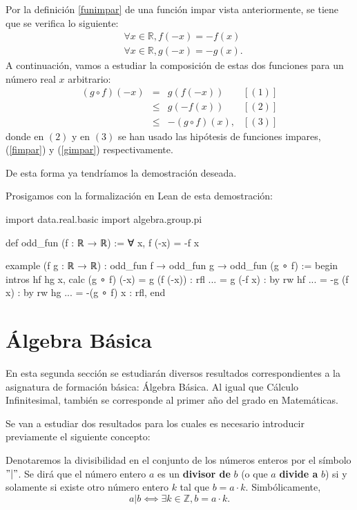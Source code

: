 \begin{demostracion}
  Por la definición \ref{funimpar} de una función impar vista
  anteriormente, se tiene que se verifica lo siguiente:
  \begin{align}
    & ∀ x ∈ ℝ, f(-x) = -f(x)  \label{fimpar} \\
    & ∀ x ∈ ℝ, g(-x) = -g(x). \label{gimpar}
  \end{align}
  A continuación, vamos a estudiar la composición de estas dos funciones
  para un número real \(x\) arbitrario:
  \[\begin{array}{llll}
      (g ∘ f)(-x) &= &g(f(-x))     & [(1)]\\
                  &≤ &g(-f(x))     & [(2)] \\
                  &≤ &-(g ∘ f)(x), & [(3)]
    \end{array}\]
  donde en \((2)\) y en \((3)\) se han usado las hipótesis de funciones
  impares, (\ref{fimpar}) y (\ref{gimpar}) respectivamente.

  De esta forma ya tendríamos la demostración deseada.
\end{demostracion}

Prosigamos con la formalización en Lean de esta demostración:
\begin{leancode}
import data.real.basic
import algebra.group.pi

def odd_fun (f : ℝ → ℝ) := ∀ x, f (-x) = -f x

example
  (f g : ℝ → ℝ)
  : odd_fun f → odd_fun g →  odd_fun (g ∘ f) :=
begin
  intros hf hg x,
  calc (g ∘ f) (-x)
      =  g (f (-x)) : rfl
  ... =  g (-f x)   : by rw hf
  ... = -g (f x)    : by rw hg
  ... =  -(g ∘ f) x : rfl,
end
\end{leancode}


\section{Álgebra Básica}

En esta segunda sección se estudiarán diversos resultados
correspondientes a la asignatura de formación básica: Álgebra Básica.
Al igual que Cálculo Infinitesimal, también se corresponde al primer año
del grado en Matemáticas.

Se van a estudiar dos resultados para los cuales es necesario introducir
previamente el siguiente concepto:
\begin{definicion}\label{division}
  Denotaremos la divisibilidad en el conjunto de los números enteros por
  el símbolo \("|"\). Se dirá que el número entero \(a\) es un
  \textbf{divisor de} \(b\) (o que \(a\) \textbf{divide a} \(b\)) si y
  solamente si existe otro número entero \(k\) tal que \(b = a · k\).
  Simbólicamente,
  \begin{equation}
    a|b ⟺ ∃ k ∈ ℤ, b = a · k.
  \end{equation}
\end{definicion}


